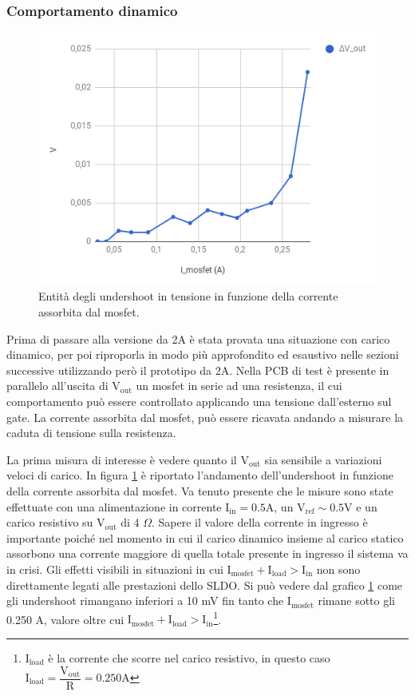 \subsubsection{Comportamento dinamico}
\begin{figure}
\centering
\includegraphics[scale=.5]{Immagini/SLDO5singlepulse}
\caption{Entità degli undershoot in tensione in funzione della corrente assorbita dal mosfet.}
\label{SLDO5singlepulse}
\end{figure}

Prima di passare alla versione da 2A è stata provata una situazione con carico dinamico, per poi riproporla in modo più approfondito ed esaustivo nelle sezioni successive utilizzando però il prototipo da 2A.
Nella PCB di test è presente in parallelo all'uscita di $\mathrm{V_{out}}$ un mosfet in serie ad una resistenza, il cui comportamento può essere controllato applicando una tensione dall'esterno sul gate. 
La corrente assorbita dal mosfet, può essere ricavata andando a misurare la caduta di tensione sulla resistenza. 

La prima misura di interesse è vedere quanto il $\mathrm{V_{out}}$ sia sensibile a variazioni veloci di carico. In figura \ref{SLDO5singlepulse} è riportato l'andamento dell'undershoot in funzione della corrente assorbita dal mosfet. Va tenuto presente che le misure sono state effettuate con una alimentazione in corrente $\mathrm{I_{in} = 0.5 A}$, un $\mathrm{V_{ref} \sim 0.5 V}$ e un carico resistivo su $\mathrm{V_{out}}$ di 4 $\Omega$. 
Sapere il valore della corrente in ingresso è importante poiché nel momento in cui il carico dinamico insieme al carico statico assorbono una corrente maggiore di quella totale presente in ingresso il sistema va in crisi. Gli effetti visibili in situazioni in cui $\mathrm{I_{mosfet} + I_{load} > I_{in}}$ non sono direttamente legati alle prestazioni dello SLDO. 
Si può vedere dal grafico \ref{SLDO5singlepulse} come gli undershoot rimangano inferiori a 10 mV fin tanto che $\mathrm{I_{mosfet}}$ rimane sotto gli 0.250 A, valore oltre cui $\mathrm{I_{mosfet} + I_{load} > I_{in}}$\footnote{$\mathrm{I_{load}}$ è la corrente che scorre nel carico resistivo, in questo caso $\mathrm{I_{load} = \dfrac{V_{out}}{R} = 0.250 A}$}. 


